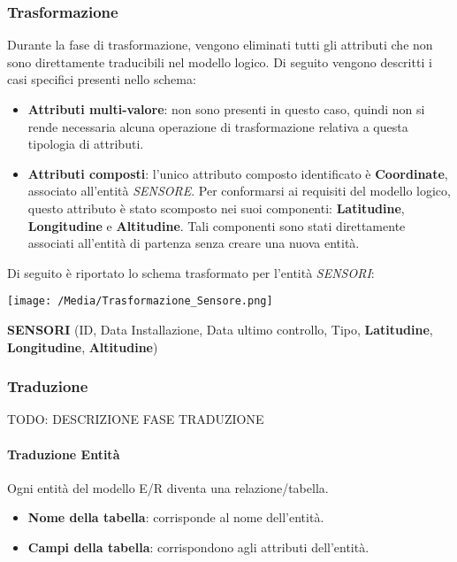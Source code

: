 \documentclass{article}
\begin{document}
\subsubsection{Trasformazione}

Durante la fase di trasformazione, vengono eliminati tutti gli attributi che non sono direttamente traducibili nel modello logico. Di seguito vengono descritti i casi specifici presenti nello schema:

\begin{itemize}
    \item \textbf{Attributi multi-valore}: non sono presenti in questo caso, quindi non si rende necessaria alcuna operazione di trasformazione relativa a questa tipologia di attributi.
    \item \textbf{Attributi composti}: l'unico attributo composto identificato è \textbf{Coordinate}, associato all'entità \textit{SENSORE}. Per conformarsi ai requisiti del modello logico, questo attributo è stato scomposto nei suoi componenti: \textbf{Latitudine}, \textbf{Longitudine} e \textbf{Altitudine}. Tali componenti sono stati direttamente associati all’entità di partenza senza creare una nuova entità.
\end{itemize}

Di seguito è riportato lo schema trasformato per l'entità \textit{SENSORI}:

\texttt{[image: /Media/Trasformazione\_Sensore.png]}

\textbf{SENSORI} (ID, Data Installazione, Data ultimo controllo, Tipo, \textbf{Latitudine}, \textbf{Longitudine}, \textbf{Altitudine})

\subsubsection{Traduzione}

TODO: DESCRIZIONE FASE TRADUZIONE

\paragraph{Traduzione Entità}

Ogni entità del modello E/R diventa una relazione/tabella.
\begin{itemize}
    \item \textbf{Nome della tabella}: corrisponde al nome dell’entità.
    \item \textbf{Campi della tabella}: corrispondono agli attributi dell’entità.
\end{itemize}
\end{document}

